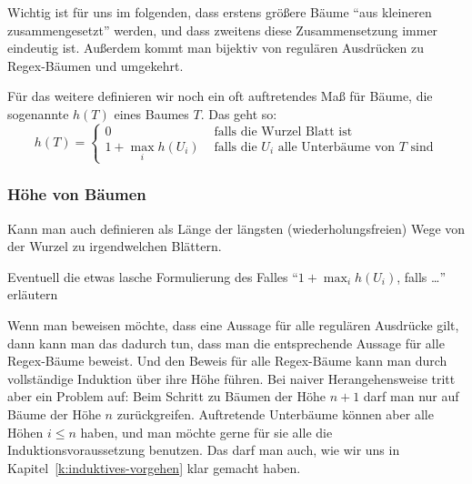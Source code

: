 Wichtig ist für uns im folgenden, dass erstens größere Bäume "`aus
kleineren zusammengesetzt"' werden, und dass zweitens diese
Zusammensetzung immer eindeutig ist. Außerdem kommt man bijektiv von
regulären Ausdrücken zu Regex-Bäumen und umgekehrt.

Für das weitere definieren wir noch ein oft auftretendes Maß für
Bäume, die sogenannte %
 $h(T)$ eines Baumes
$T$. Das geht so:
\[
h(T) =
\begin{cases}
  0 & \text{ falls die Wurzel Blatt ist }\\
  1+\max_i h(U_i) & \text{ falls die $U_i$ alle Unterbäume von $T$ sind}
\end{cases}
\]
\begin{tutorium}
  \subsubsection*{Höhe von Bäumen}
  Kann man auch definieren als Länge der längsten
  (wiederholungsfreien) Wege von der Wurzel zu irgendwelchen Blättern.

  Eventuell die etwas lasche Formulierung des Falles "`$1+\max_i
  h(U_i)$, falls \dots"' erläutern
\end{tutorium}

Wenn man beweisen möchte, dass eine Aussage für alle regulären
Ausdrücke gilt, dann kann man das dadurch tun, dass man die
entsprechende Aussage für alle Regex-Bäume beweist. Und den Beweis für
alle Regex-Bäume kann man durch vollständige Induktion über ihre Höhe
führen. Bei naiver Herangehensweise tritt aber ein Problem auf: Beim
Schritt zu Bäumen der Höhe $n+1$
darf man nur auf Bäume der Höhe $n$
zurückgreifen. Auftretende Unterbäume können aber alle Höhen $i\leq n$
haben, und man möchte gerne für sie alle die Induktionsvoraussetzung
benutzen. Das darf man auch, wie wir uns in
Kapitel~\ref{k:induktives-vorgehen} klar gemacht haben.



